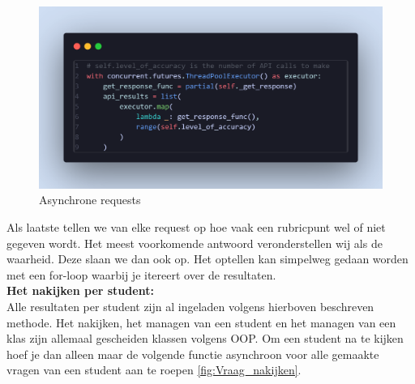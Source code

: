 \documentclass[12pt]{article}
\begin{document}
\begin{figure}[H] %
    \centering
    \includegraphics[width=0.9 \textwidth]{./images/methoden/nakijken/threading.png}
    \caption{Asynchrone requests}
    \label{fig:async}
\end{figure}

Als laatste tellen we van elke request op hoe vaak een rubricpunt wel of niet gegeven wordt. Het meest voorkomende antwoord veronderstellen wij als de waarheid. Deze slaan we dan ook op. Het optellen kan simpelweg gedaan worden met een for-loop waarbij je itereert over de resultaten.\vspace{0.25cm}
\\

\textbf{Het nakijken per student:} \\
Alle resultaten per student zijn al ingeladen volgens hierboven beschreven methode. Het nakijken, het managen van een student en het managen van een klas zijn allemaal gescheiden klassen volgens OOP. Om een student na te kijken hoef je dan alleen maar de volgende functie asynchroon voor alle gemaakte vragen van een student aan te roepen \ref{fig:Vraag_nakijken}. 
\end{document}
